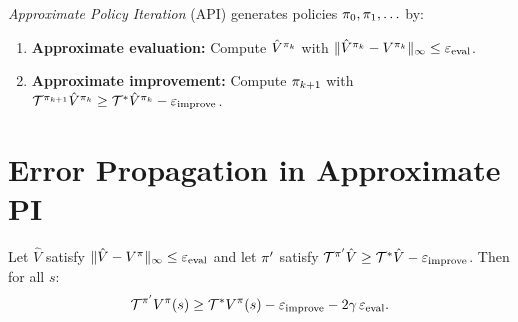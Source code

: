 \documentclass[11pt,a4paper]{article}
\begin{document}
\begin{definition}
\label{def:approx_pi}
\emph{Approximate Policy Iteration} (API) generates policies
$\pi_0, \pi_1, \ldots$ by:
\begin{enumerate}
  \item \textbf{Approximate evaluation:} Compute $\hat{V}^{\pi_k}$
    with $\|\hat{V}^{\pi_k} - V^{\pi_k}\|_\infty
    \leq \varepsilon_{\mathrm{eval}}$.
  \item \textbf{Approximate improvement:} Compute $\pi_{k+1}$ with
    $\mathcal{T}^{\pi_{k+1}} \hat{V}^{\pi_k}
    \geq \mathcal{T}^* \hat{V}^{\pi_k}
    - \varepsilon_{\mathrm{improve}}$.
\end{enumerate}
\end{definition}

\section{Error Propagation in Approximate PI}
\label{sec:error_propagation}

\begin{lemma}
\label{lem:one_step}
Let $\hat{V}$ satisfy $\|\hat{V} - V^\pi\|_\infty \leq
\varepsilon_{\mathrm{eval}}$ and let $\pi'$ satisfy
$\mathcal{T}^{\pi'} \hat{V} \geq \mathcal{T}^* \hat{V}
- \varepsilon_{\mathrm{improve}}$. Then for all $s$:
\begin{equation}
  \mathcal{T}^{\pi'} V^\pi(s)
  \geq \mathcal{T}^* V^\pi(s)
  - \varepsilon_{\mathrm{improve}}
  - 2\gamma\,\varepsilon_{\mathrm{eval}}.
  \label{eq:one_step}
\end{equation}
\end{lemma}
\end{document}
